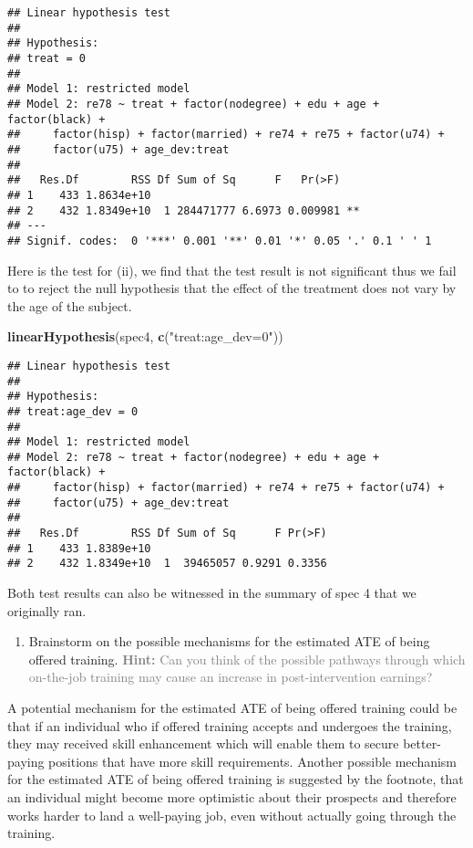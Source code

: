 \documentclass[
]{article}
\newenvironment{Shaded}{\begin{snugshade}}{\end{snugshade}}
\newcommand{\FunctionTok}[1]{\textcolor[rgb]{0.13,0.29,0.53}{\textbf{#1}}}
\newcommand{\NormalTok}[1]{#1}
\newcommand{\StringTok}[1]{\textcolor[rgb]{0.31,0.60,0.02}{#1}}
\providecommand{\tightlist}{%
  \setlength{\itemsep}{0pt}\setlength{\parskip}{0pt}}
\begin{document}
\begin{verbatim}
## Linear hypothesis test
## 
## Hypothesis:
## treat = 0
## 
## Model 1: restricted model
## Model 2: re78 ~ treat + factor(nodegree) + edu + age + factor(black) + 
##     factor(hisp) + factor(married) + re74 + re75 + factor(u74) + 
##     factor(u75) + age_dev:treat
## 
##   Res.Df        RSS Df Sum of Sq      F   Pr(>F)   
## 1    433 1.8634e+10                                
## 2    432 1.8349e+10  1 284471777 6.6973 0.009981 **
## ---
## Signif. codes:  0 '***' 0.001 '**' 0.01 '*' 0.05 '.' 0.1 ' ' 1
\end{verbatim}

Here is the test for (ii), we find that the test result is not
significant thus we fail to to reject the null hypothesis that the
effect of the treatment does not vary by the age of the subject.

\begin{Shaded}
\begin{Highlighting}[]
\FunctionTok{linearHypothesis}\NormalTok{(spec4, }\FunctionTok{c}\NormalTok{(}\StringTok{"treat:age\_dev=0"}\NormalTok{))}
\end{Highlighting}
\end{Shaded}

\begin{verbatim}
## Linear hypothesis test
## 
## Hypothesis:
## treat:age_dev = 0
## 
## Model 1: restricted model
## Model 2: re78 ~ treat + factor(nodegree) + edu + age + factor(black) + 
##     factor(hisp) + factor(married) + re74 + re75 + factor(u74) + 
##     factor(u75) + age_dev:treat
## 
##   Res.Df        RSS Df Sum of Sq      F Pr(>F)
## 1    433 1.8389e+10                           
## 2    432 1.8349e+10  1  39465057 0.9291 0.3356
\end{verbatim}

Both test results can also be witnessed in the summary of spec 4 that we
originally ran.

\begin{enumerate}
\def\labelenumi{\arabic{enumi}.}
\setcounter{enumi}{2}
\tightlist
\item
  Brainstorm on the possible mechanisms for the estimated ATE of being
  offered training.
  \textcolor{gray}{\textbf{Hint:} Can you think of the possible pathways through which on-the-job training may cause an increase in post-intervention earnings?}\label{item:oot:ate-vs-ite}
\end{enumerate}

A potential mechanism for the estimated ATE of being offered training
could be that if an individual who if offered training accepts and
undergoes the training, they may received skill enhancement which will
enable them to secure better-paying positions that have more skill
requirements. Another possible mechanism for the estimated ATE of being
offered training is suggested by the footnote, that an individual might
become more optimistic about their prospects and therefore works harder
to land a well-paying job, even without actually going through the
training.
\end{document}
